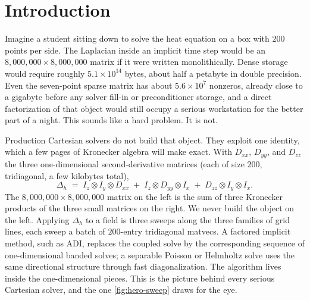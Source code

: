 \documentclass[11pt]{article}
\newcommand{\kron}{\otimes}
\newcommand{\Lap}{\Delta_h}
\begin{document}
\section{Introduction}
\label{sec:intro}

Imagine a student sitting down to solve the heat equation on a box
with $200$ points per side.  The Laplacian inside an implicit time
step would be an $8{,}000{,}000 \times 8{,}000{,}000$ matrix if it
were written monolithically.  Dense storage would require roughly
$5.1\times10^{14}$ bytes, about half a petabyte in double precision.
Even the seven-point sparse matrix has about $5.6\times10^7$
nonzeros, already close to a gigabyte before any solver fill-in or
preconditioner storage, and a direct factorization of that object
would still occupy a serious workstation for the better part of a
night.  This sounds like a hard problem.  It is not.

Production Cartesian solvers do not build that object.  They exploit
one identity, which a few pages of Kronecker algebra will make exact.
With $D_{xx}$, $D_{yy}$, and $D_{zz}$ the three one-dimensional
second-derivative matrices (each of size $200$, tridiagonal, a few
kilobytes total),
\begin{equation*}
  \Lap
  \;=\;
  I_z \kron I_y \kron D_{xx}
  \;+\;
  I_z \kron D_{yy} \kron I_x
  \;+\;
  D_{zz} \kron I_y \kron I_x.
\end{equation*}
The $8{,}000{,}000\times 8{,}000{,}000$ matrix on the left is the
sum of three Kronecker products of the three small matrices on the
right.  We never build the object on the left.  Applying $\Lap$ to a
field is three sweeps along the three families of grid lines, each
sweep a batch of $200$-entry tridiagonal matvecs.  A factored
implicit method, such as ADI, replaces the coupled solve by the
corresponding sequence of one-dimensional banded solves; a separable
Poisson or Helmholtz solve uses the same directional structure through
fast diagonalization.  The algorithm lives inside the
one-dimensional pieces.  This is the picture behind every serious
Cartesian solver, and the one \cref{fig:hero-sweep}
draws for the eye.
\end{document}
